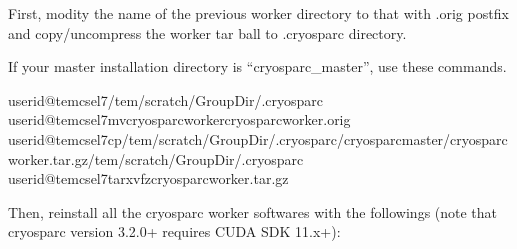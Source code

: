 \documentclass[a4paper,10pt,english]{sphinxmanual}
\begin{document}
\sphinxAtStartPar
First, modity the name of the previous worker directory to that with .orig postfix and copy/uncompress the worker tar ball to .cryosparc directory.

\sphinxAtStartPar
If your master installation directory is “cryosparc\_master”, use these commands.

\begin{sphinxVerbatim}[commandchars=\\\{\}]
userid@tem\PYGZhy{}cs\PYGZhy{}el7\PYGZdl{}\PYGZgt{}/tem/scratch/\PYGZlt{}GroupDir\PYGZgt{}/.cryosparc
userid@tem\PYGZhy{}cs\PYGZhy{}el7\PYGZdl{}\PYGZgt{}mvcryosparc\PYGZus{}workercryosparc\PYGZus{}worker.orig
userid@tem\PYGZhy{}cs\PYGZhy{}el7\PYGZdl{}\PYGZgt{}cp/tem/scratch/\PYGZlt{}GroupDir\PYGZgt{}/.cryosparc/cryosparc\PYGZus{}master/cryosparc\PYGZus{}worker.tar.gz/tem/scratch/\PYGZlt{}GroupDir\PYGZgt{}/.cryosparc
userid@tem\PYGZhy{}cs\PYGZhy{}el7\PYGZdl{}\PYGZgt{}tarxvfzcryosparc\PYGZus{}worker.tar.gz
\end{sphinxVerbatim}

\sphinxAtStartPar
Then, re\sphinxhyphen{}install all the cryosparc worker softwares with the followings (note that cryosparc version 3.2.0+ requires CUDA SDK 11.x+):
\end{document}
